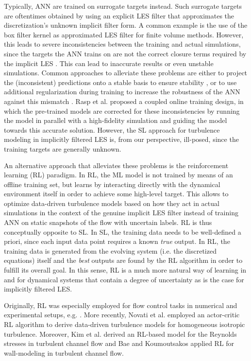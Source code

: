 Typically, ANN are trained on surrogate targets instead.
Such surrogate targets are oftentimes obtained by using an explicit LES filter that approximates the discretization's unknown implicit filter form.
A common example is the use of the box filter kernel as approximated LES filter for finite volume methods. %
However, this leads to severe inconsistencies between the training and actual simulations, since the targets the ANN trains on are not the correct closure terms required by the implicit LES \cite{beck2019deep}.
This can lead to inaccurate results or even unstable simulations.
Common approaches to alleviate these problems are either to project the (inconsistent) predictions onto a stable basis to ensure stability \cite{beck2019deep,maulik2019subgrid}, or to use additional regularization during training to increase the robustness of the ANN against this mismatch \cite{kurz2021investigating}.
Rasp et al. \cite{rasp2020coupled} proposed a coupled online training design, in which the pre-trained models are corrected for these inconsistencies by running the model in parallel with a high-fidelity simulation and guiding the model towards this accurate solution.
However, the SL approach for turbulence modeling in implicitly filtered LES is, from our perspective, ill-posed, since the training targets are generally unknown.

An alternative approach that alleviates these problems is the reinforcement learning (RL) paradigm.
In RL, the ML model is not trained by means of an offline training set, but learns by interacting directly with the dynamical environment itself in order to achieve some high-level target.
This allows to optimize data-driven turbulence models based on how they act in actual simulations in the context of the genuine implicit LES filter instead of training ANN on static snapshots of the flow with uncertain labels.
RL is thus conceptually opposite to SL.
In SL, the training data needs to be well-defined a priori, since each input data point requires a known \textit{true} output.
In RL, the training data is generated from the evolving system (i.e. the discretized equations) itself and the \textit{best} outputs are found by the RL algorithm in order to fulfill its overall goal. %
In this sense, RL is a much more natural way of learning in and for dynamical systems that contain a degree of uncertainty as is the case for implicitly filtered LES.

Originally, RL was especially employed for flow control tasks in numerical and experimental setups, e.g. \cite{rabault2019accelerating,rabault2019artificial,tang2020robust,fan2020reinforcement}.
More recently, Novati et al. \cite{novati2021automating} employed an actor-critic RL algorithm to derive data-driven turbulence models for homogeneous isotropic turbulence.
Moreover, Kim et al. \cite{kim2022deep} derived an RL-based model for the Reynolds stresses in turbulent channel flow and Bae and Koumoutsakos \cite{bae2022scientific} applied RL for wall-modeling in turbulent channel flow.

